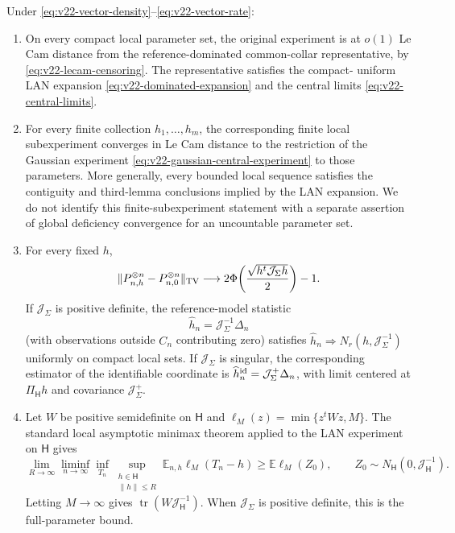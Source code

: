 \begin{theorem}
\label{thm:v22-vector-boundary-gaussian}
Under \eqref{eq:v22-vector-density}--\eqref{eq:v22-vector-rate}:

\begin{enumerate}
\item On every compact local parameter set, the original experiment is at
$o(1)$ Le Cam distance from the reference-dominated common-collar representative, by
\eqref{eq:v22-lecam-censoring}.  The representative satisfies the compact-
uniform LAN expansion \eqref{eq:v22-dominated-expansion} and the central
limits \eqref{eq:v22-central-limits}.

\item For every finite collection $h_1,\ldots,h_m$, the corresponding finite
local subexperiment converges in Le Cam distance to the restriction of the
Gaussian experiment \eqref{eq:v22-gaussian-central-experiment} to those
parameters.  More generally, every bounded local sequence satisfies the
contiguity and third-lemma conclusions implied by the LAN expansion.  We do
not identify this finite-subexperiment statement with a separate assertion
of global deficiency convergence for an uncountable parameter set.

\item For every fixed $h$,
\begin{equation}\label{eq:v22-testing-profile}
 \|P_{n,h}^{\otimes n}-P_{n,0}^{\otimes n}\|_{\rm TV}
 \longrightarrow
 2\Phi\!\left(\frac{\sqrt{h^t\mathcal J_\Sigma h}}2\right)-1.
\end{equation}
If $\mathcal J_\Sigma$ is positive definite, the reference-model statistic
\begin{equation}\label{eq:v22-local-estimator}
                 \widehat h_n=\mathcal J_\Sigma^{-1}\Delta_n
\end{equation}
(with observations outside $C_n$ contributing zero) satisfies
$\widehat h_n\Rightarrow N_r(h,\mathcal J_\Sigma^{-1})$ uniformly on compact
local sets.  If $\mathcal J_\Sigma$ is singular, the corresponding estimator
of the identifiable coordinate is
$\widehat h_n^{\rm id}=\mathcal J_\Sigma^+\Delta_n$, with limit centered at
$\Pi_{\mathsf H}h$ and covariance $\mathcal J_\Sigma^+$.

\item Let $W$ be positive semidefinite on $\mathsf H$ and
$\ell_M(z)=\min\{z^tWz,M\}$.  The standard local asymptotic minimax theorem
applied to the LAN experiment on $\mathsf H$ gives
\begin{equation}\label{eq:v22-minimax-truncated}
 \lim_{R\to\infty}\liminf_{n\to\infty}
 \inf_{T_n}\sup_{\substack{h\in\mathsf H\\\|h\|\le R}}
 \mathbb E_{n,h}\ell_M(T_n-h)
 \ge
 \mathbb E\ell_M(Z_0),
 \qquad
 Z_0\sim N_{\mathsf H}(0,\mathcal J_{\mathsf H}^{-1}).
\end{equation}
Letting $M\to\infty$ gives
$\operatorname{tr}(W\mathcal J_{\mathsf H}^{-1})$.  When
$\mathcal J_\Sigma$ is positive definite, this is the full-parameter bound.
\end{enumerate}
\end{theorem}

